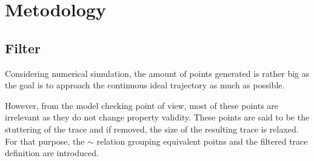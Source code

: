\documentclass[12pt,twoside,draft]{fithesis}
\begin{document}
\chapter{Metodology}
\section{Filter}
Considering numerical simulation, the amount of points
generated is rather big as the goal is to approach the continuous ideal
trajectory as much as possible.

However, from the model checking point of view, most of these points
are irrelevant as they do not change
property validity. These points are said to be the stuttering of the
trace\cite{lamport} and if removed, the size of the resulting trace
is relaxed. For that purpose, the $\sim$ relation grouping equivalent
poitns and the filtered trace definition are introduced.
\end{document}
